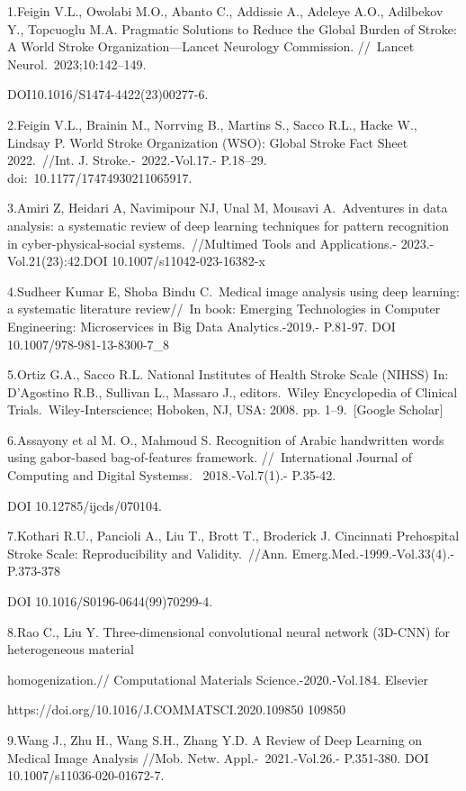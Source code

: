 \begin{noparindent}
1.Feigin V.L., Owolabi M.O., Abanto C., Addissie A., Adeleye A.O.,
Adilbekov Y., Topcuoglu M.A. Pragmatic Solutions to Reduce the Global
Burden of Stroke: A World Stroke Organization---Lancet Neurology
Commission. //~Lancet Neurol.~2023;10:142--149.

DOI10.1016/S1474-4422(23)00277-6.~

2.Feigin V.L., Brainin M., Norrving B., Martins S., Sacco R.L., Hacke
W., Lindsay P. World Stroke Organization (WSO): Global Stroke Fact Sheet
2022.~//Int. J. Stroke.-~2022.-Vol.17.- P.18--29.
doi:~10.1177/17474930211065917.~

3.Amiri Z, Heidari A, Navimipour NJ, Unal M, Mousavi A.~Adventures in
data analysis: a systematic review of deep learning techniques for
pattern recognition in cyber-physical-social systems.~//Multimed Tools
and Applications.- 2023.- Vol.21(23):42.DOI 10.1007/s11042-023-16382-x

4.Sudheer Kumar E, Shoba Bindu C.~Medical image analysis using deep
learning: a systematic literature review//~In book: Emerging
Technologies in Computer Engineering: Microservices in Big Data
Analytics.-2019.- P.81-97. DOI 10.1007/978-981-13-8300-7\_8

5.Ortiz G.A., Sacco R.L. National Institutes of Health Stroke Scale
(NIHSS) In: D'Agostino R.B., Sullivan L., Massaro J., editors.~Wiley
Encyclopedia of Clinical Trials.~Wiley-Interscience; Hoboken, NJ, USA:
2008. pp. 1--9.~{[}Google Scholar{]}

6.Assayony et al M. O., Mahmoud S. Recognition of Arabic handwritten
words using gabor-based bag-of-features
framework. //\emph{~}International Journal of Computing and Digital
Systemss. \emph{~}2018.-Vol.7(1).- P.35-42.

DOI 10.12785/ijcds/070104.

7.Kothari R.U., Pancioli A., Liu T., Brott T., Broderick J. Cincinnati
Prehospital Stroke Scale: Reproducibility and Validity.~//Ann.
Emerg.Med.\emph{-}1999.-Vol.33(4).- P.373-378

DOI 10.1016/S0196-0644(99)70299-4.

8.Rao C., Liu Y. Three-dimensional convolutional neural network (3D-CNN)
for heterogeneous material

homogenization.// Computational Materials
Science.-2020.-Vol.184. Elsevier

https://doi.org/10.1016/J.COMMATSCI.2020.109850 109850

9.Wang J., Zhu H., Wang S.H., Zhang Y.D. A Review of Deep Learning on
Medical Image Analysis //Mob. Netw. Appl.-\emph{~}2021.-Vol.26.-
P.351-380. DOI 10.1007/s11036-020-01672-7.~


\end{noparindent}
